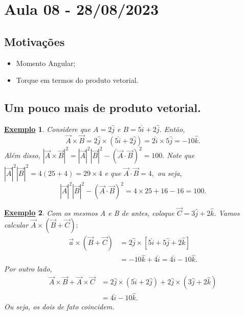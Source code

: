 \documentclass{article}
\newtheorem{example}{\underline{Exemplo}}
\begin{document}
\section{Aula 08 - 28/08/2023}
\subsection{Motivações}
\begin{itemize}
  \item Momento Angular;
  \item Torque em termos do produto vetorial.
\end{itemize}
\subsection{Um pouco mais de produto vetorial.}
\begin{example}
  Considere que \(A = 2 \hat{j}\) e \(B = 5\hat{i} + 2 \hat{j}\). Então, 
  \[
    \vec{A} \times{\vec{B}} = 2\hat{j} \times (5\hat{i} + 2\hat{j}) = 2\hat{i}\times 5\hat{j} = -10\hat{k}.
  \]
  Além disso, \(|\vec{A}\times \vec{B}|^{2} = |\vec{A}|^{2}|\vec{B}|^{2} - (\vec{A}\cdot \vec{B})^{2} = 100.\) Note que 
  \(|\vec{A}|^{2}|\vec{B}|^{2} = 4 (25+4) = 29\times 4\) e que \(\vec{A}\cdot \vec{B} = 4, \) ou seja, 
  \[
    |\vec{A}|^{2}|\vec{B}|^{2} - (\vec{A}\cdot \vec{B})^{2} = 4\times 25 + 16 - 16 = 100.
  \]
\end{example}
\begin{example}
  Com os mesmos A e B de antes, coloque \(\vec{C} = 3\hat{j} + 2 \hat{k}.\) Vamos calcular \(\vec{A}\times(\vec{B} + \vec{C}):\)
  \begin{align*}
    \vec{a}\times(\vec{B}+\vec{C}) &= 2\hat{j} \times [5\hat{i} + 5\hat{j} + 2\hat{k}]\\
                                   &= - 10\hat{k} + 4\hat{i} = 4\hat{i} - 10\hat{k}.
  \end{align*}
  Por outro lado, 
  \begin{align*}
    \vec{A} \times \vec{B} + \vec{A} \times \vec{C} &= 2\hat{j}\times(5\hat{i} + 2\hat{j}) + 2\hat{j}\times(3\hat{j}+2\hat{k})\\
                                                    &= 4\hat{i} - 10\hat{k}.
  \end{align*}
  Ou seja, os dois de fato coincidem.
\end{example}
\end{document}
